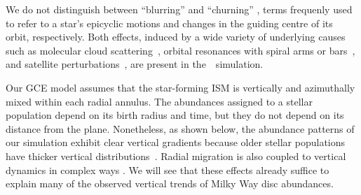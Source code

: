 \documentclass[draft2.tex]{subfiles}
\begin{document}
We do not distinguish between ``blurring'' and ``churning'' 
\citep{Schoenrich2009a}, terms frequenly used to refer to a star's epicyclic 
motions and changes in the guiding centre of its orbit, respectively. 
Both effects, induced by a wide variety of underlying causes such as molecular 
cloud scattering~\citep{Mihalas1981, Jenkins1990, Jenkins1992}, orbital 
resonances with spiral arms or bars~\citep{Sellwood2002, Minchev2011}, and 
satellite perturbations~\citep{Bird2012}, are present in the~\hsim~simulation. 
\par 
Our GCE model assumes that the star-forming ISM is vertically and azimuthally 
mixed within each radial annulus. 
The abundances assigned to a stellar population depend on its birth radius and 
time, but they do not depend on its distance from the plane. 
Nonetheless, as shown below, the abundance patterns of our simulation exhibit 
clear vertical gradients because older stellar populations have thicker 
vertical distributions~\citep{Bird2021}. 
Radial migration is also coupled to vertical dynamics in complex ways 
\citep{Solway2012, Minchev2012b}. 
We will see that these effects already suffice to explain many of the observed 
vertical trends of Milky Way disc abundances. 


\end{document}
